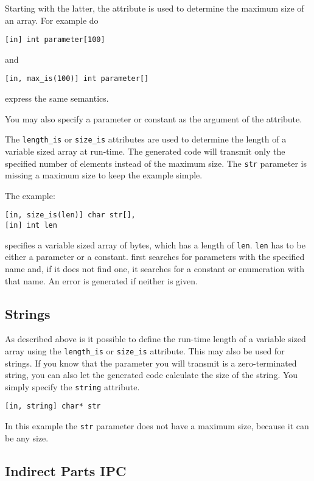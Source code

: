 Starting with the latter, the attribute is used to determine
the maximum size of an array. For example do
\begin{verbatim}
[in] int parameter[100]
\end{verbatim}
and
\begin{verbatim}
[in, max_is(100)] int parameter[]
\end{verbatim}
express the same semantics.

You may also specify a parameter or constant as the argument of the attribute.

The \verb|length_is| or \verb|size_is| attributes are used to determine the
length of a variable sized array at run-time.  The generated code will
transmit only the specified number of elements instead of the maximum size.
The \verb|str| parameter is missing a maximum size to keep the example
simple.

The example:
\begin{verbatim}
[in, size_is(len)] char str[],
[in] int len
\end{verbatim}

specifies a variable sized array of bytes, which has a length of \verb|len|.
\verb|len| has to be either a parameter or a constant. \dice{} first searches
for parameters with the specified name and, if it does not find one, it
searches for a constant or enumeration with that name. An error is generated
if neither is given.


\subsection{Strings}

As described above is it possible to define the run-time length of a variable
sized array using the \verb|length_is| or \verb|size_is| attribute. This may
also be used for strings.  If you know that the parameter you will transmit is
a zero-terminated string, you can also let the generated code calculate the
size of the string. You simply specify the \verb|string| attribute.

\begin{verbatim}
[in, string] char* str
\end{verbatim}

In this example the \verb|str| parameter does not have a maximum size, because
it can be any size.

\subsection{Indirect Parts IPC}

